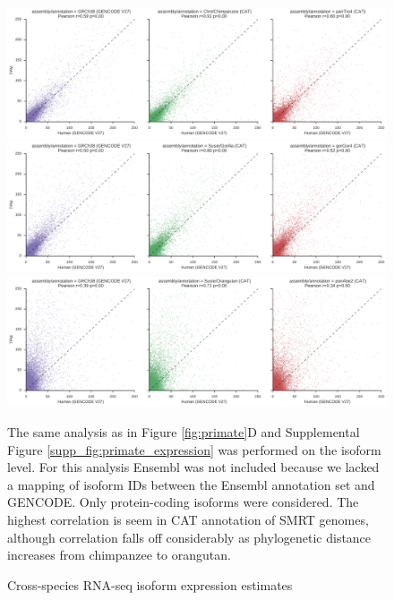 \documentclass[fleqn,10pt]{wlscirep}
\begin{document}
\begin{figure}

\includegraphics[width=0.8\paperwidth,keepaspectratio]{chimp_kallisto_transcripts.pdf}

\includegraphics[width=0.8\paperwidth,keepaspectratio]{gorilla_kallisto_transcripts.pdf}

\includegraphics[width=0.8\paperwidth,keepaspectratio]{orangutan_kallisto_transcripts.pdf}

\caption{Cross-species RNA-seq isoform expression estimates}
The same analysis as in Figure \ref{fig:primate}D and Supplemental Figure \ref{supp_fig:primate_expression} was performed on the isoform level. For this analysis Ensembl was not included because we lacked a mapping of isoform IDs between the Ensembl annotation set and GENCODE. Only protein-coding isoforms were considered. The highest correlation is seem in CAT annotation of SMRT genomes, although correlation falls off considerably as phylogenetic distance increases from chimpanzee to orangutan.

\label{supp_fig:primate_transcript_expression}
\end{figure}
\end{document}
